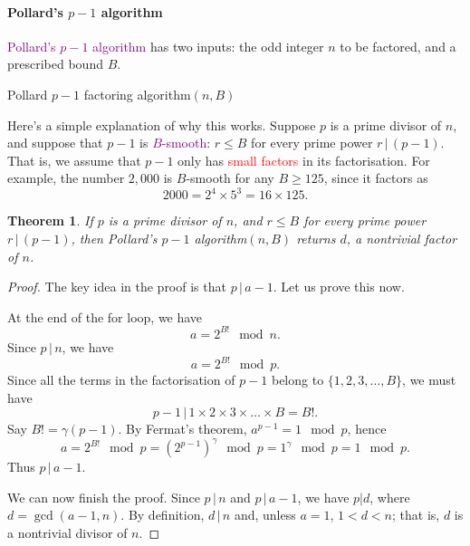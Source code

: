 \documentclass[a4paper, 11pt, openany]{book}
\numberwithin{equation}{section}
\theoremstyle{plain}
\newtheorem{theorem}	[equation]	{Theorem}
\theoremstyle{definition}
\newcommand{\divides}{\,|\,}
\newcommand{\Important}[1]{\textcolor{red}{#1}}
\newcommand{\Define}[1]{\textcolor{purple}{#1}}
\begin{document}
\paragraph{Pollard's $p-1$ algorithm}

\Define{Pollard's $p-1$ algorithm} has two inputs: the odd integer $n$ to be factored, and a prescribed bound $B$.


\begin{algorithm}[H]
\caption{Pollard $p-1$ factoring algorithm$(n,B)$}
\begin{algorithmic}[1]
    \EndFor
    \Else{}
    \EndIf
\end{algorithmic}
\end{algorithm}

Here's a simple explanation of why this works. Suppose $p$ is a prime divisor of $n$, and suppose that $p-1$ is \Define{$B$-smooth}: $r \le B$ for every prime power $r \divides (p-1)$. That is, we assume that $p-1$ only has \Important{small factors} in its factorisation. For example, the number $2,000$ is $B$-smooth for any $B \ge 125$, since it factors as
\[
    2000 = 2^4 \times 5^3 = 16 \times 125.
\]

\begin{theorem}\label{th:pollard_p-1}
If $p$ is a prime divisor of $n$, and $r \le B$ for every prime power $r \divides (p-1)$, then Pollard's $p-1$ algorithm$(n,B)$ returns $d$, a nontrivial factor of $n$.
\end{theorem}


\begin{proof}
The key idea in the proof is that $p \divides a-1$. Let us prove this now.

At the end of the for loop, we have
\[
    a = 2^{B!} \mod n.
\]
Since $p \divides n$, we have
\[
    a = 2^{B!} \mod p.
\]
Since all the terms in the factorisation of $p-1$ belong to $\{1, 2, 3, \dots, B\}$, we must have
\[
    p-1 \divides 1 \times 2 \times 3 \times \dots \times B = B!.
\]
Say $B! = \gamma (p-1)$. By Fermat's theorem, $a^{p-1} = 1 \mod p$, hence
\[
    a = 2^{B!} \mod p = \left( 2^{p-1} \right)^\gamma \mod p = 1^\gamma \mod p = 1 \mod p.
\]
Thus $p \divides a-1$.

We can now finish the proof. Since $p \divides n$ and $p \divides a-1$, we have $p | d$, where $d = \gcd(a-1,n)$. By definition, $d \divides n$ and, unless $a = 1$, $1 < d < n$; that is, $d$ is a nontrivial divisor of $n$.
\end{proof}
\end{document}

